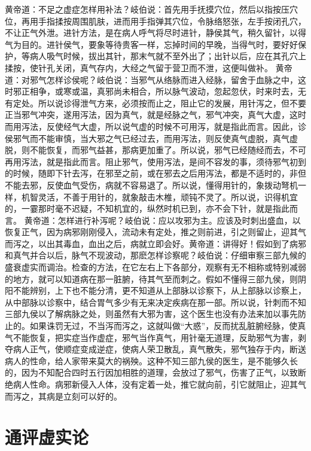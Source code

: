 \documentclass[a4paper,12pt,UTF8,twoside]{ctexbook}
\begin{document}
黄帝道：不足之虚症怎样用补法？岐伯说：首先用手抚摸穴位，然后以指按压穴位，再用手指揉按周围肌肤，进而用手指弹其穴位，令脉络怒张，左手按闭孔穴，不让正气外泄。进针方法，是在病人呼气将尽时进针，静侯其气，稍久留针，以得气为目的。进针侯气，要象等待贵客一样，忘掉时间的早晚，当得气时，要好好保护，等病人吸气时候，拔出其针，那末气就不至外出了；出针以后，应在其孔穴上揉按，使针孔关闭，真气存内，大经之气留于营卫而不泄，这便叫做补。
黄帝道：对邪气怎样诊侯呢？岐伯说：当邪气从络脉而进入经脉，留舍于血脉之中，这时邪正相争，或寒或温，真邪尚未相合，所以脉气波动，忽起忽伏，时来时去，无有定处。所以说诊得泄气方来，必须按而止之，阻止它的发展，用针泻之，但不要正当邪气冲突，遂用泻法，因为真气，就是经脉之气，邪气冲突，真气大虚，这时而用泻法，反使经气大虚，所以说气虚的时候不可用泻，就是指此而言。因此，诊侯邪气而不能审慎，当大邪之气已经过去，而用泻法，则反使真气虚脱，真气虚脱，则不能恢复，而邪气益甚，那病更加重了。所以说，邪气已经随经而去，不可再用泻法，就是指此而言。阻止邪气，使用泻法，是间不容发的事，须待邪气初到的时候，随即下针去泻，在邪至之前，或在邪去之后用泻法，都是不适时的，非但不能去邪，反使血气受伤，病就不容易退了。所以说，懂得用针的，象拨动弩机一样，机智灵活，不善于用针的，就象敲击木椎，顽钝不灵了。所以说，识得机宜的，一霎那时毫不迟疑，不知机宜的，纵然时机已到，亦不会下针，就是指此而言。
黄帝道：怎样进行补泻呢？岐伯说：应以攻邪为主。应该及时刺出盛血，以恢复正气，因为病邪刚刚侵入，流动未有定处，推之则前进，引之则留止，迎其气而泻之，以出其毒血，血出之后，病就立即会好。黄帝道：讲得好！假如到了病邪和真气并合以后，脉气不现波动，那麽怎样诊察呢？岐伯说：仔细审察三部九候的盛衰虚实而调治。检查的方法，在它左右上下各部分，观察有无不相称或特别减弱的地方，就可以知道病在那一脏腑，待其气至而刺之。假如不懂得三部九侯，则阴阳不能辨别，上下也不能分清，更不知道从上部脉以诊察下，从上部脉以诊察上，从中部脉以诊察中，结合胃气多少有无来决定疾病在那一部。所以说，针刺而不知三部九侯以了解病脉之处，则虽然有大邪为害，这个医生也没有办法来加以事先防止的。如果诛罚无过，不当泻而泻之，这就叫做“大惑”，反而扰乱脏腑经脉，使真气不能恢复，把实症当作虚症，邪气当作真气，用针毫无道理，反助邪气为害，剥夺病人正气，使顺症变成逆症，使病人荣卫散乱，真气散失，邪气独存于内，断送病人的性命，给人家带来莫大的祸殃。这种不知三部九侯的医生，是不能够久长的，因为不知配合四时五行因加相胜的道理，会放过了邪气，伤害了正气，以致断绝病人性命。病邪新侵入人体，没有定着一处，推它就向前，引它就阻止，迎其气而泻之，其病是立刻可以好的。

\chapter{通评虚实论}
\end{document}
